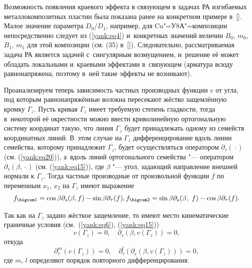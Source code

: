 Возможность появления краевого эффекта в связующем в задачах РА изгибаемых металлокомпозитных пластин была показана ранее на конкретном примере в~[].
Малое значение параметра $D_0 /D_1 $, например, для Cu"=У8А"=композиции непосредственно следует из (\ref{yank:eq4}) и~конкретных значений величин $B_0 $, $m_0 $, $B_1 $, $m_1 $ для этой композиции (см. (35) в~[]). Следовательно, рассматриваемая задача РА является задачей с~сингулярным возмущением, и~решение её может обладать локальными и~краевыми эффектами в~связующем (арматура всюду равнонапряжена, поэтому в~ней такие эффекты не возникают).

Проанализируем теперь зависимость частных производных функции $v$ от угла, под которым равнонапряжённые волокна пересекают жёстко защемлённую кромку $\Gamma_z $. 
Пусть кривая $\Gamma_z $ имеет требуемую степень гладкости, тогда в~некоторой её окрестности можно ввести криволинейную ортогональную систему координат такую, что линия $\Gamma_z $ будет принадлежать одному из семейств координатных линий. 
В~этом случае на $\Gamma_z $ дифференцирование вдоль линии семейства, которому принадлежит $\Gamma_z $, будет осуществляться оператором $\partial_{\tau}({} \cdot {})$ (см. (\ref{yank:eq20})), а~вдоль линий ортогонального семейства "--- оператором $\partial_s (\beta, {} \cdot {})$ (см. (\ref{yank:eq15})), где $\beta$ "--- угол, задающий направление внешней нормали к $\Gamma_z $. Тогда частные производные от произвольной функции $f$ по переменным
$x_1 $, $x_2 $ на $\Gamma_z $ имеют выражение
\begin{equation} \label{yank:eq25}
f_{\bigcom 1} =\cos \beta \partial_s (\beta,f)-\sin \beta \partial_\tau  (f),f_{\bigcom 2} =\sin \beta \partial
_s  ( {\beta ,\,\,f} )-\cos \beta \partial_\tau  ( f ).
\end{equation}

Так как на $\Gamma_z  $ задано жёсткое защемление, то имеют место кинематические граничные условия (см.~(\ref{yank:eq6}), (\ref{yank:eq15}))
\begin{equation} \label{yank:eq26}
v( \Gamma_z   )=0, \quad \partial_s  (\beta, v(\Gamma_z ))=0,
\end{equation}
откуда
\begin{equation} \label{yank:eq27}
\partial_\tau ^m  (v(\Gamma_z ))=0, \quad \partial_\tau ^l (\partial_s (\beta, v( \Gamma_z )))=0,
\end{equation}
где $m$, $l$ определяют порядок повторного дифференцирования.

